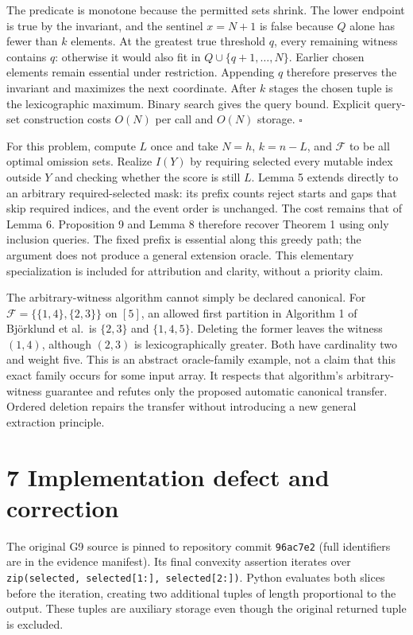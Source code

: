 \documentclass[
  11pt,
  letterpaper,
]{article}
\begin{document}
The predicate is monotone because the permitted sets shrink. The lower
endpoint is true by the invariant, and the sentinel \(x=N+1\) is false
because \(Q\) alone has fewer than \(k\) elements. At the greatest true
threshold \(q\), every remaining witness contains \(q\): otherwise it
would also fit in \(Q\cup\{q+1,\ldots,N\}\). Earlier chosen elements
remain essential under restriction. Appending \(q\) therefore preserves
the invariant and maximizes the next coordinate. After \(k\) stages the
chosen tuple is the lexicographic maximum. Binary search gives the query
bound. Explicit query-set construction costs \(O(N)\) per call and
\(O(N)\) storage. \(\square\)

For this problem, compute \(L\) once and take \(N=h\), \(k=n-L\), and
\(\mathcal F\) to be all optimal omission sets. Realize \(I(Y)\) by
requiring selected every mutable index outside \(Y\) and checking
whether the score is still \(L\). Lemma 5 extends directly to an
arbitrary required-selected mask: its prefix counts reject starts and
gaps that skip required indices, and the event order is unchanged. The
cost remains that of Lemma 6. Proposition 9 and Lemma 8 therefore
recover Theorem 1 using only inclusion queries. The fixed prefix is
essential along this greedy path; the argument does not produce a
general extension oracle. This elementary specialization is included for
attribution and clarity, without a priority claim.

The arbitrary-witness algorithm cannot simply be declared canonical. For
\(\mathcal F=\{\{1,4\},\{2,3\}\}\) on \([5]\), an allowed first
partition in Algorithm 1 of Björklund et al.~is \(\{2,3\}\) and
\(\{1,4,5\}\). Deleting the former leaves the witness \((1,4)\),
although \((2,3)\) is lexicographically greater. Both have cardinality
two and weight five. This is an abstract oracle-family example, not a
claim that this exact family occurs for some input array. It respects
that algorithm's arbitrary-witness guarantee and refutes only the
proposed automatic canonical transfer. Ordered deletion repairs the
transfer without introducing a new general extraction principle.

\hypertarget{implementation-defect-and-correction}{%
\section{7 Implementation defect and
correction}\label{implementation-defect-and-correction}}

The original G9 source is pinned to repository commit \texttt{96ac7e2}
(full identifiers are in the evidence manifest). Its final convexity
assertion iterates over
\texttt{zip(selected,\ selected{[}1:{]},\ selected{[}2:{]})}. Python
evaluates both slices before the iteration, creating two additional
tuples of length proportional to the output. These tuples are auxiliary
storage even though the original returned tuple is excluded.
\end{document}
